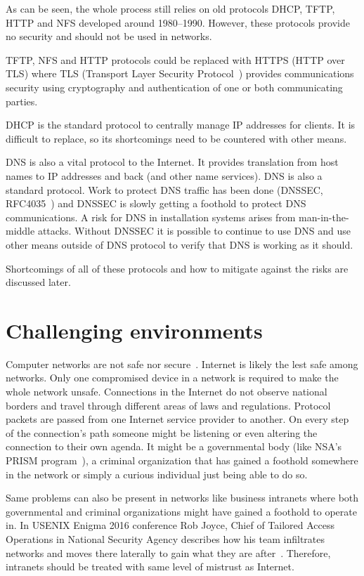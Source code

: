 As can be seen, the whole process still relies on old protocols DHCP,
TFTP, HTTP and NFS developed around 1980--1990. However, these
protocols provide no security and should not be used in
networks.

TFTP, NFS and HTTP protocols could be replaced with HTTPS (HTTP over
TLS) where TLS (Transport Layer Security Protocol~\cite{RFC5246})
provides communications security using cryptography and authentication
of one or both communicating parties.

DHCP is the standard protocol to centrally manage IP addresses for
clients. It is difficult to replace, so its shortcomings need to be
countered with other means.

DNS is also a vital protocol to the Internet. It provides translation
from host names to IP addresses and back (and other name
services). DNS is also a standard protocol. Work to protect DNS
traffic has been done (DNSSEC, RFC4035~\cite{rfc4035}) and DNSSEC is
slowly getting a foothold to protect DNS communications. A risk for
DNS in installation systems arises from man-in-the-middle
attacks. Without DNSSEC it is possible to continue to use DNS and use
other means outside of DNS protocol to verify that DNS is working as
it should.

Shortcomings of all of these protocols and how to mitigate against the
risks are discussed later.

\section{Challenging environments}

Computer networks are not safe nor secure~\cite{beyondcorp}. Internet
is likely the lest safe among networks. Only one compromised device in
a network is required to make the whole network unsafe. Connections in
the Internet do not observe national borders and travel through
different areas of laws and regulations. Protocol packets are passed
from one Internet service provider to another. On every step of the
connection's path someone might be listening or even altering the
connection to their own agenda. It might be a governmental body (like
NSA's PRISM program~\cite{nsa-prism}), a criminal organization that
has gained a foothold somewhere in the network or simply a curious
individual just being able to do so.

Same problems can also be present in networks like business intranets
where both governmental and criminal organizations might have gained a
foothold to operate in. In USENIX Enigma 2016 conference Rob Joyce,
Chief of Tailored Access Operations in National Security Agency
describes how his team infiltrates networks and moves there laterally
to gain what they are after~\cite{nsa-tao}. Therefore, intranets
should be treated with same level of mistrust as Internet.


